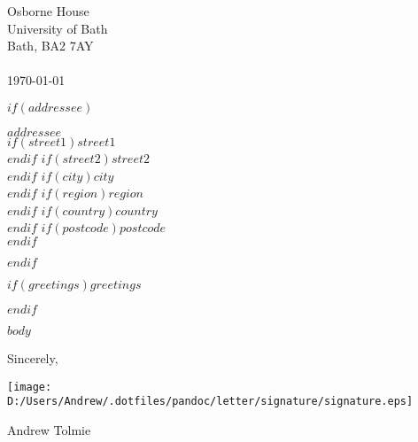 \documentclass{article}
\begin{document}
\hfill\begin{minipage}{0.3\linewidth}
	Osborne House \\
	University of Bath \\
	Bath, BA2 7AY \\
	\\
	\today \\
\end{minipage}

$if(addressee)$
\begin{minipage}{0.4\linewidth}
	$addressee$\\
	$if(street1)$$street1$\\$endif$
	$if(street2)$$street2$\\$endif$
	$if(city)$$city$\\$endif$
	$if(region)$$region$\\$endif$
	$if(country)$$country$\\$endif$
	$if(postcode)$$postcode$\\$endif$
\end{minipage}
$endif$

$if(greetings)$$greetings$ \par \bigskip $endif$

$body$ \par \bigskip

Sincerely, \par \medskip

\texttt{[image: D:/Users/Andrew/.dotfiles/pandoc/letter/signature/signature.eps]} \par
Andrew Tolmie
\end{document}
